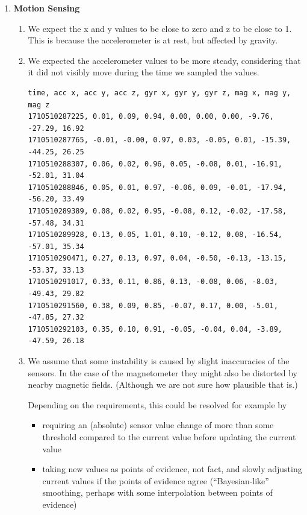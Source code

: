 \documentclass{article}
\begin{document}
\begin{enumerate}[label={\arabic*.}]
    \item \textbf{Motion Sensing}
    \begin{enumerate}
        \item We expect the x and y values to be close to zero and z to be close to 1. This is because the accelerometer is at rest, but affected by gravity.
        
        \item We expected the accelerometer values to be more steady, considering that it did not visibly move during the time we sampled the values.

        \begin{verbatim}
time, acc x, acc y, acc z, gyr x, gyr y, gyr z, mag x, mag y, mag z
1710510287225, 0.01, 0.09, 0.94, 0.00, 0.00, 0.00, -9.76, -27.29, 16.92
1710510287765, -0.01, -0.00, 0.97, 0.03, -0.05, 0.01, -15.39, -44.25, 26.25
1710510288307, 0.06, 0.02, 0.96, 0.05, -0.08, 0.01, -16.91, -52.01, 31.04
1710510288846, 0.05, 0.01, 0.97, -0.06, 0.09, -0.01, -17.94, -56.20, 33.49
1710510289389, 0.08, 0.02, 0.95, -0.08, 0.12, -0.02, -17.58, -57.48, 34.31
1710510289928, 0.13, 0.05, 1.01, 0.10, -0.12, 0.08, -16.54, -57.01, 35.34
1710510290471, 0.27, 0.13, 0.97, 0.04, -0.50, -0.13, -13.15, -53.37, 33.13
1710510291017, 0.33, 0.11, 0.86, 0.13, -0.08, 0.06, -8.03, -49.43, 29.82
1710510291560, 0.38, 0.09, 0.85, -0.07, 0.17, 0.00, -5.01, -47.85, 27.32
1710510292103, 0.35, 0.10, 0.91, -0.05, -0.04, 0.04, -3.89, -47.59, 26.18
        \end{verbatim}

        \item We assume that some instability is caused by slight inaccuracies of the sensors. In the case of the magnetometer they might also be distorted by nearby magnetic fields. (Although we are not sure how plausible that is.)
        
        Depending on the requirements, this could be resolved for example by \begin{itemize}
            \item requiring an (absolute) sensor value change of more than some threshold compared to the current value before updating the current value
            \item taking new values as points of evidence, not fact, and slowly adjusting current values if the points of evidence agree (\enquote{Bayesian-like} smoothing, perhaps with some interpolation between points of evidence)
        \end{itemize}
    \end{enumerate}


\end{enumerate}
\end{document}
